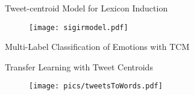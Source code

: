 \documentclass[handout]{beamer}
\begin{document}
\begin{frame}{Tweet-centroid Model for Lexicon Induction}

\begin{figure}[htb]
	\centering
	 \texttt{[image: sigirmodel.pdf]}
\end{figure}



\end{frame}


\begin{frame}{Multi-Label Classification of Emotions with TCM}
\begin{scriptsize}

\begin{figure}[htbp]
\begin{center}
\end{center}
\end{figure}

\end{scriptsize}
\end{frame}

\begin{frame}{Transfer Learning with Tweet Centroids}

\begin{figure}[htb]
	\centering
	 \texttt{[image: pics/tweetsToWords.pdf]}
\end{figure}



\end{frame}
\end{document}
